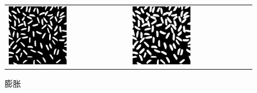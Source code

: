\documentclass[a4paper]{ctexart}
\begin{document}
\begin{figure}[H]
    \begin{tabular}{p{}p{}}
    \centering
      \includegraphics*[width=0.5\textwidth]{fig/erd.png}
      \caption{腐蚀}
      &
      \centering
      \includegraphics*[width=0.5\textwidth]{fig/dlt.png}
      \caption{膨胀}
    \end{tabular}


\end{figure}
\end{document}

